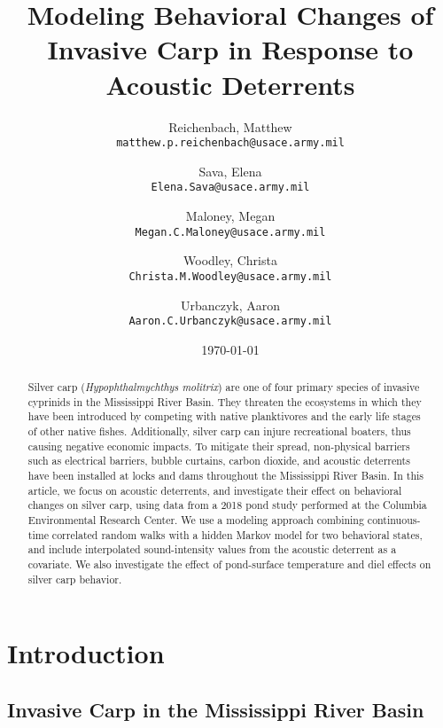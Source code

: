 \documentclass[12pt]{article}
\begin{document}
\begin{abstract}
	Silver carp (\emph{Hypophthalmychthys molitrix}) are one of four primary species of invasive cyprinids in the Mississippi River Basin. They threaten the ecosystems in which they have been introduced by competing with native planktivores and the early life stages of other native fishes. Additionally, silver carp can injure recreational boaters, thus causing negative economic impacts. To mitigate their spread, non-physical barriers such as electrical barriers, bubble curtains, carbon dioxide, and acoustic deterrents have been installed at locks and dams throughout the Mississippi River Basin. In this article, we focus on acoustic deterrents, and investigate their effect on behavioral changes on silver carp, using data from a 2018 pond study performed at the Columbia Environmental Research Center. We use a modeling approach combining continuous-time correlated random walks with a hidden Markov model for two behavioral states, and include interpolated sound-intensity values from the acoustic deterrent as a covariate. We also investigate the effect of pond-surface temperature and diel effects on silver carp behavior.
\end{abstract}

\title{Modeling Behavioral Changes of Invasive Carp in Response to Acoustic Deterrents}
\author{
	Reichenbach, Matthew \\
	\texttt{matthew.p.reichenbach@usace.army.mil}
	\and
	Sava, Elena \\
	\texttt{Elena.Sava@usace.army.mil}
	\and
	Maloney, Megan \\
	\texttt{Megan.C.Maloney@usace.army.mil}
	\and
	Woodley, Christa \\
	\texttt{Christa.M.Woodley@usace.army.mil}
	\and
	Urbanczyk, Aaron \\
	\texttt{Aaron.C.Urbanczyk@usace.army.mil}
}
\date{\today}

\maketitle

\section{Introduction}

	\subsection{Invasive Carp in the Mississippi River Basin}
\end{document}
